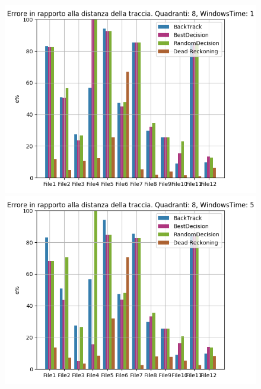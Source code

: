 \documentclass[12pt,a4paper,openright,twoside]{report}
\begin{document}
\begin{figure}[H]
\centering 
\includegraphics[scale=0.4]{firstChart8-1} 
\includegraphics[scale=0.4]{firstChart8-5} 
\end{figure}
\end{document}
